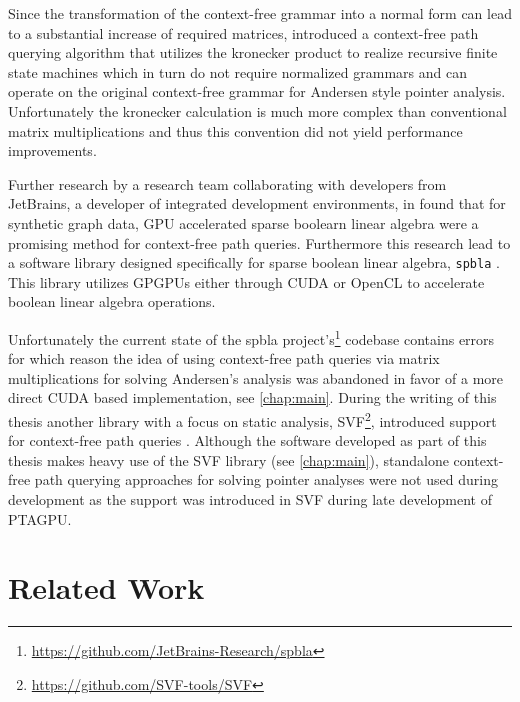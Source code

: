 Since the transformation of the context-free grammar into a normal form can lead to a substantial increase of required matrices, \cite{orachev2020context} introduced a context-free path querying algorithm that utilizes the kronecker product to realize recursive finite state machines which in turn do not require normalized grammars and can operate on the original context-free grammar for Andersen style pointer analysis.
Unfortunately the kronecker calculation is much more complex than conventional matrix multiplications and thus this convention did not yield performance improvements.

Further research by a research team collaborating with developers from JetBrains, a developer of integrated development environments, in \cite{mishin2019evaluation} found that for synthetic graph data, GPU accelerated sparse boolearn linear algebra were a promising method for context-free path queries.
Furthermore this research lead to a software library designed specifically for sparse boolean linear algebra, \verb|spbla| \cite{orachev2021spbla}. This library utilizes GPGPUs either through CUDA or OpenCL to accelerate boolean linear algebra operations.

Unfortunately the current state of the spbla project's\footnote{\url{https://github.com/JetBrains-Research/spbla}} codebase contains errors for which reason the idea of using context-free path queries via matrix multiplications for solving Andersen's analysis was abandoned in favor of a more direct CUDA based implementation, see \autoref{chap:main}.
During the writing of this thesis another library with a focus on static analysis, SVF\footnote{\url{https://github.com/SVF-tools/SVF}}, introduced support for context-free path queries \cite{lei2022taming}. Although the software developed as part of this thesis makes heavy use of the SVF library (see \autoref{chap:main}), standalone context-free path querying approaches for solving pointer analyses were not used during development as the support was introduced in SVF during late development of PTAGPU.
\section{Related Work}
